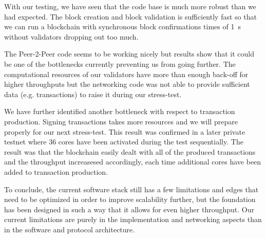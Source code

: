 With our testing, we have seen that the code base is much more robust
than we had expected. The block creation and block validation is
sufficiently fast so that we can run a blockchain with synchronous block
confirmations times of \SI{1}{s} without validators dropping out too
much.

The Peer-2-Peer code seems to be working nicely but results show that it
could be one of the bottlenecks currently preventing us from going
further. The computational resources of our validators have more than
enough back-off for higher throughputs but the networking code was not
able to provide sufficient data (e.g. transactions) to raise it during
our stress-test.

We have further identified another bottleneck with respect to transaction
production. Signing transactions takes more resources and we will
prepare properly for our next stress-test. This result was confirmed in
a later private testnet where 36 cores have been activated during the
test sequentially. The result was that the blockchain easily dealt with
all of the produced transactions and the throughput increasesed
accordingly, each time additional cores have been added to transaction
production.

To conclude, the current software stack still has a few limitations and
edges that need to be optimized in order to improve scalability further,
but the foundation has been designed in such a way that it allows for
even higher throughput. Our current limitations are purely in the
implementation and networking aspects than in the software and protocol
architecture.
